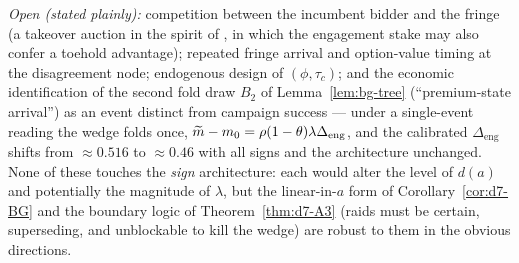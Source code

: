 \emph{Open (stated plainly):} competition between the incumbent bidder and the fringe (a takeover auction in the spirit of \citet{BulowHuangKlemperer1999}, in which the engagement stake may also confer a toehold advantage); repeated fringe arrival and option-value timing at the disagreement node; endogenous design of $(\phi,\tau_{c})$; and the economic identification of the second fold draw $B_{2}$ of Lemma~\ref{lem:bg-tree} (``premium-state arrival'') as an event distinct from campaign success --- under a single-event reading the wedge folds once, $\widetilde{m}-m_{0}=\rho(1-\theta)\lambda\Delta_{\mathrm{eng}}$, and the calibrated $\Delta_{\mathrm{eng}}$ shifts from $\approx0.516$ to $\approx0.46$ with all signs and the architecture unchanged. None of these touches the \emph{sign} architecture: each would alter the level of $d(a)$ and potentially the magnitude of $\lambda$, but the linear-in-$a$ form of Corollary~\ref{cor:d7-BG} and the boundary logic of Theorem~\ref{thm:d7-A3} (raids must be certain, superseding, and unblockable to kill the wedge) are robust to them in the obvious directions.

